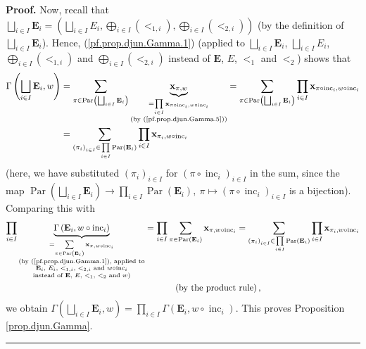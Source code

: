 \documentclass[numbers=enddot,12pt,final,onecolumn,notitlepage,abstracton]{scrartcl}
\theoremstyle{definition}
\newenvironment{proof}[1][Proof]{\noindent\textbf{#1.} }{\ \rule{0.5em}{0.5em}}
\let\sumnonlimits\sum
\let\prodnonlimits\prod
\renewcommand{\sum}{\sumnonlimits\limits}
\renewcommand{\prod}{\prodnonlimits\limits}
\newenvironment{verlong}{}{}
\begin{document}
\begin{verlong}
\begin{footnotesize}
\begin{proof}
Now, recall that $\bigsqcup_{i\in I}\mathbf{E}_{i}=\left(  \bigsqcup_{i\in
I}E_{i},\bigoplus_{i\in I}\left(  <_{1,i}\right)  ,\bigoplus_{i\in I}\left(
<_{2,i}\right)  \right)  $ (by the definition of $\bigsqcup_{i\in I}%
\mathbf{E}_{i}$). Hence, (\ref{pf.prop.djun.Gamma.1}) (applied to
$\bigsqcup_{i\in I}\mathbf{E}_{i}$, $\bigsqcup_{i\in I}E_{i}$, $\bigoplus
_{i\in I}\left(  <_{1,i}\right)  $ and $\bigoplus_{i\in I}\left(
<_{2,i}\right)  $ instead of $\mathbf{E}$, $E$, $<_{1}$ and $<_{2}$) shows
that%
\begin{align*}
\Gamma\left(  \bigsqcup_{i\in I}\mathbf{E}_{i},w\right)   &  =\sum_{\pi
\in\operatorname*{Par}\left(  \bigsqcup_{i\in I}\mathbf{E}_{i}\right)
}\underbrace{\mathbf{x}_{\pi,w}}_{\substack{=\prod_{i\in I}\mathbf{x}%
_{\pi\circ\operatorname*{inc}\nolimits_{i},w\circ\operatorname*{inc}%
\nolimits_{i}}\\\text{(by (\ref{pf.prop.djun.Gamma.5}))}}}=\sum_{\pi
\in\operatorname*{Par}\left(  \bigsqcup_{i\in I}\mathbf{E}_{i}\right)  }%
\prod_{i\in I}\mathbf{x}_{\pi\circ\operatorname*{inc}\nolimits_{i}%
,w\circ\operatorname*{inc}\nolimits_{i}}\\
&  =\sum_{\left(  \pi_{i}\right)  _{i\in I}\in\prod_{i\in I}%
\operatorname*{Par}\left(  \mathbf{E}_{i}\right)  }\prod_{i\in I}%
\mathbf{x}_{\pi_{i},w\circ\operatorname*{inc}\nolimits_{i}}%
\end{align*}
(here, we have substituted $\left(  \pi_{i}\right)  _{i\in I}$ for $\left(
\pi\circ\operatorname*{inc}\nolimits_{i}\right)  _{i\in I}$ in the sum, since
the map $\operatorname*{Par}\left(  \bigsqcup_{i\in I}\mathbf{E}_{i}\right)
\rightarrow\prod_{i\in I}\operatorname*{Par}\left(  \mathbf{E}_{i}\right)
,\ \pi\mapsto\left(  \pi\circ\operatorname*{inc}\nolimits_{i}\right)  _{i\in
I}$ is a bijection). Comparing this with%
\begin{align*}
\prod_{i\in I}\underbrace{\Gamma\left(  \mathbf{E}_{i},w\circ
\operatorname*{inc}\nolimits_{i}\right)  }_{\substack{=\sum_{\pi
\in\operatorname*{Par}\left(  \mathbf{E}_{i}\right)  }\mathbf{x}_{\pi
,w\circ\operatorname*{inc}\nolimits_{i}}\\\text{(by
(\ref{pf.prop.djun.Gamma.1}), applied to}\\\mathbf{E}_{i}\text{, }E_{i}\text{,
}<_{1,i}\text{, }<_{2,i}\text{ and }w\circ\operatorname*{inc}\nolimits_{i}%
\\\text{instead of }\mathbf{E}\text{, }E\text{, }<_{1}\text{, }<_{2}\text{ and
}w\text{)}}}  &  =\prod_{i\in I}\sum_{\pi\in\operatorname*{Par}\left(
\mathbf{E}_{i}\right)  }\mathbf{x}_{\pi,w\circ\operatorname*{inc}%
\nolimits_{i}}=\sum_{\left(  \pi_{i}\right)  _{i\in I}\in\prod_{i\in
I}\operatorname*{Par}\left(  \mathbf{E}_{i}\right)  }\prod_{i\in I}%
\mathbf{x}_{\pi_{i},w\circ\operatorname*{inc}\nolimits_{i}}\\
&  \ \ \ \ \ \ \ \ \ \ \left(  \text{by the product rule}\right)  ,
\end{align*}
we obtain $\Gamma\left(  \bigsqcup_{i\in I}\mathbf{E}_{i},w\right)
=\prod_{i\in I}\Gamma\left(  \mathbf{E}_{i},w\circ\operatorname*{inc}%
\nolimits_{i}\right)  $. This proves Proposition \ref{prop.djun.Gamma}.
\end{proof}


\end{footnotesize}
\end{verlong}
\end{document}
